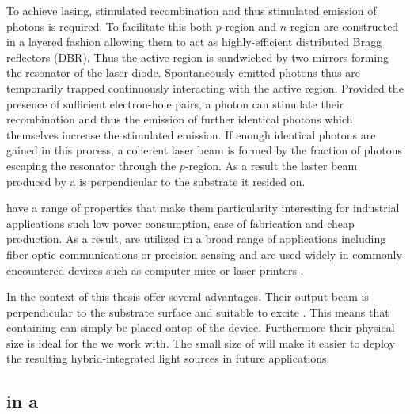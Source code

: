 		To achieve lasing, stimulated recombination and thus stimulated emission of photons is required. To facilitate this both $p$-region and $n$-region are constructed in a layered fashion allowing them to act as highly-efficient distributed Bragg reflectors (DBR). Thus the active region is sandwiched by two mirrors forming the resonator of the laser diode. Spontaneously emitted photons thus are temporarily trapped continuously interacting with the active region. Provided the presence of sufficient electron-hole pairs, a photon can stimulate their recombination and thus the emission of further identical photons which themselves increase the stimulated emission. If enough identical photons are gained in this process, a coherent laser beam is formed by the fraction of photons escaping the resonator through the $p$-region. As a result the laster beam produced by a \VCSEL is perpendicular to the substrate it resided on.

		\VCSELs have a range of properties that make them particularity interesting for industrial applications such low power consumption, ease of fabrication and cheap production. As a result, \VCSELs are utilized in a broad range of applications including fiber optic communications or precision sensing and are used widely in commonly encountered devices such as computer mice or laser printers \cite{ihfg2009}.

		In the context of this thesis \VCSELs offer several advantages. Their output beam is perpendicular to the substrate surface and suitable to excite \sivs. This means that \nds containing \sivs can simply be placed ontop of the device. Furthermore their physical size is ideal for the \nds we work with. The small size of \VCSELs will make it easier to deploy the resulting hybrid-integrated light sources in future applications.

	\subsection{\siv in a \Vcsel}

